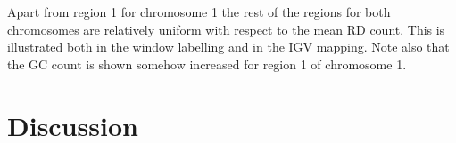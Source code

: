 \documentclass[12pt]{article}
\begin{document}


	
	

Apart from region 1 for chromosome 1 the rest of the regions for both chromosomes are relatively uniform with respect to the mean RD count. This is illustrated both in the window labelling and in the IGV mapping. Note also that the GC count is shown somehow increased for region 1 of chromosome 1.  



\clearpage


\section{Discussion}
\label{discussion}
\end{document}
